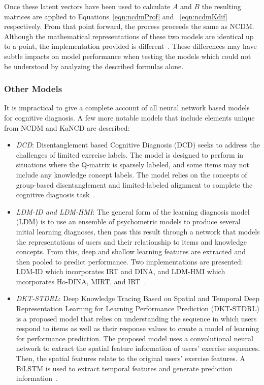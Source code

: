 \documentclass[letterpaper, 12pt, captions=tableabove]{scrreprt}
\begin{document}
	Once these latent vectors have been used to calculate $A$ and $B$ the resulting matrices are applied to Equations~\ref{eqn:ncdmProf} and ~\ref{eqn:ncdmKdif} respectively. From that point forward, the process proceeds the same as NCDM. Although the mathematical representations of these two models are identical up to a point, the implementation provided is different~\cite{bigdata2021}. These differences may have subtle impacts on model performance when testing the models which could not be understood by analyzing the described formulas alone.

			\subsubsection{Other Models}
			\label{sss:otherModels}
				It is impractical to give a complete account of all neural network based models for cognitive diagnosis. A few more notable models that include elements unique from NCDM and KaNCD are described:
			\begin{itemize}
				\item \emph{DCD}: Disentanglement based Cognitive Diagnosis (DCD) seeks to address the challenges of limited exercise labels. The model is designed to perform in situations where the Q-matrix is sparsely labeled, and some items may not include any knowledge concept labels. The model relies on the concepts of group-based disentanglement and limited-labeled alignment to complete the cognitive diagnosis task~\cite{chen2024}.
			
				\item \emph{LDM-ID and LDM-HMI}: The general form of the learning diagnosis model (LDM) is to use an ensemble of psychometric models to produce several initial learning diagnoses, then pass this result through a network that models the representations of users and their relationship to items and knowledge concepts. From this, deep and shallow learning features are extracted and then pooled to predict performance. Two implementations are presented: LDM-ID which incorporates IRT and DINA, and LDM-HMI which incorporates Ho-DINA, MIRT, and IRT~\cite{wang2023}. 
			
				\item \emph{DKT-STDRL}: Deep Knowledge Tracing Based on Spatial and Temporal Deep Representation Learning for Learning Performance Prediction (DKT-STDRL) is a proposed model that relies on understanding the sequence in which users respond to items as well as their response values to create a model of learning for performance prediction. The proposed model uses a convolutional neural network to extract the spatial feature information of users' exercise sequences. Then, the spatial features relate to the original users' exercise features. A BiLSTM is used to extract temporal features and generate prediction information~\cite{lyu2022}.
			\end{itemize}
\end{document}
